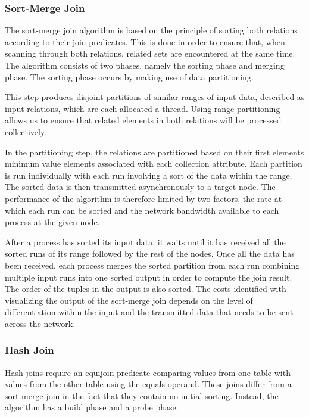 \documentclass[10pt,twocolumn]{witseiepaper}
\begin{document}
\subsubsection{Sort-Merge Join}\label{sortmerge}

The sort-merge join algorithm is based on the principle of sorting both relations according to their join predicates. This is done in order to ensure that, when scanning through both relations, related sets are encountered at the same time. The algorithm consists of two phases, namely the sorting phase and merging phase. The sorting phase occurs by making use of data partitioning.

This step produces disjoint partitions of similar ranges of input data, described as input relations, which are each allocated a thread. Using range-partitioning allows us to ensure that related elements in both relations will be processed collectively\cite{dist}.

In the partitioning step, the relations are partitioned based on their first elements minimum value elements associated with each collection attribute. Each partition is run individually with each run involving a sort of the data within the range. The sorted data is then transmitted asynchronously to a target node. The performance of the algorithm is therefore limited by two factors, the rate at which each run can be sorted and the network bandwidth available to each process at the given node.

After a process has sorted its input data, it waits until it has received all the sorted runs of its range followed by the rest of the nodes. Once all the data has been received, each process merges the sorted partition from each run combining multiple input runs into one sorted output in order to compute the join result. The order of the tuples in the output is also sorted. The costs identified with visualizing the output of the sort-merge join depends on the level of differentiation within the input and the transmitted data that needs to be sent across the network\cite{dist}.

\subsubsection{Hash Join}

Hash joins require an equijoin predicate comparing values from one table with values from the other table using the equals operand. These joins differ from a sort-merge join in the fact that they contain no initial sorting. Instead, the algorithm has a build phase and a probe phase\cite{equijoin}. 
\end{document}

